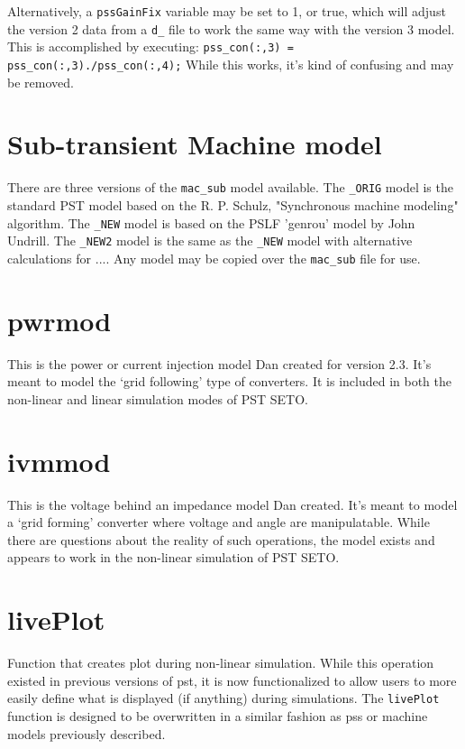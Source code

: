 Alternatively, a \verb|pssGainFix| variable may be set to 1, or true, which will adjust the version 2 data from a \verb|d_| file to work the same way with the version 3 model.
This is accomplished by executing: \verb|pss_con(:,3) = pss_con(:,3)./pss_con(:,4);|
While this works, it's kind of confusing and may be removed.

\section{Sub-transient Machine model}  
There are three versions of the \verb|mac_sub| model available.
The \verb|_ORIG| model is the standard PST model based on the R. P. Schulz, "Synchronous machine modeling" algorithm.
The \verb|_NEW| model is based on the PSLF 'genrou' model by John Undrill.
The \verb|_NEW2| model is the same as the \verb|_NEW| model with alternative calculations for ....
Any model may be copied over the \verb|mac_sub| file for use.

\section{pwrmod}  
This is the power or current injection model Dan created for version 2.3.
It's meant to model the `grid following' type of converters.
It is included in both the non-linear and linear simulation modes of PST SETO.

\section{ivmmod}  
This is the voltage behind an impedance model Dan created.
It's meant to model a `grid forming' converter where voltage and angle are manipulatable.
While there are questions about the reality of such operations, the model exists and appears to work in the non-linear simulation  of PST SETO.

\section{livePlot}  
Function that creates plot during non-linear simulation.
While this operation existed in previous versions of pst, it is now functionalized to allow users to more easily define what is displayed (if anything) during simulations.
The \verb|livePlot| function is designed to be overwritten in a similar fashion as pss or machine models previously described.

